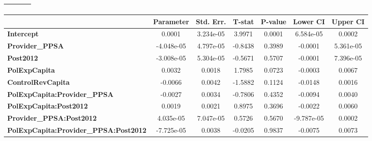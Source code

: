 \begin{center}
\begin{tabular}{lclc}
\textbf{}                                     &                    & \textbf{                     }   &                  \\
\bottomrule
\end{tabular}
\begin{tabular}{lcccccc}
                                              & \textbf{Parameter} & \textbf{Std. Err.} & \textbf{T-stat} & \textbf{P-value} & \textbf{Lower CI} & \textbf{Upper CI}  \\
\midrule
\textbf{Intercept}                            &       0.0001       &     3.234e-05      &      3.9971     &      0.0001      &     6.584e-05     &       0.0002       \\
\textbf{Provider\_PPSA}                       &     -4.048e-05     &     4.797e-05      &     -0.8438     &      0.3989      &      -0.0001      &     5.361e-05      \\
\textbf{Post2012}                             &     -3.008e-05     &     5.304e-05      &     -0.5671     &      0.5707      &      -0.0001      &     7.396e-05      \\
\textbf{PolExpCapita}                         &       0.0032       &       0.0018       &      1.7985     &      0.0723      &      -0.0003      &       0.0067       \\
\textbf{ControlRevCapita}                     &      -0.0066       &       0.0042       &     -1.5882     &      0.1124      &      -0.0148      &       0.0016       \\
\textbf{PolExpCapita:Provider\_PPSA}          &      -0.0027       &       0.0034       &     -0.7806     &      0.4352      &      -0.0094      &       0.0040       \\
\textbf{PolExpCapita:Post2012}                &       0.0019       &       0.0021       &      0.8975     &      0.3696      &      -0.0022      &       0.0060       \\
\textbf{Provider\_PPSA:Post2012}              &     4.035e-05      &     7.047e-05      &      0.5726     &      0.5670      &     -9.787e-05    &       0.0002       \\
\textbf{PolExpCapita:Provider\_PPSA:Post2012} &     -7.725e-05     &       0.0038       &     -0.0205     &      0.9837      &      -0.0075      &       0.0073       \\
\bottomrule
\end{tabular}
\end{center}